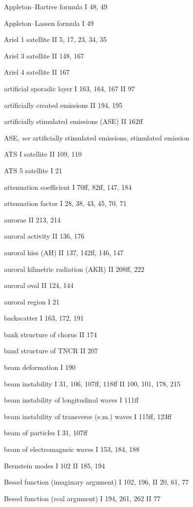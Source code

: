 \begin{thesubjectindex}
\item Appleton--Hartree formula I 48, 49
\item Appleton--Lassen formula I 49
\item Ariel 1 satellite II 5, 17, 23, 34, 35
\item Ariel 3 satellite II 148, 167
\item Ariel 4 satellite II 167
\item artificial sporadic layer I 163, 164, 167 II 97
\item artificially created emissions II 194, 195
\item artificially stimulated emissions (ASE) II 162ff
\item ASE, {\it see\/} artificially stimulated emissions, stimulated emission
\item ATS I satellite II 109, 110
\item ATS 5 satellite I 21
\item attenuation coefficient I 70ff, 82ff, 147, 184
\item attenuation factor I 28, 38, 43, 45, 70, 71
\item aurorae II 213, 214
\item auroral activity II 136, 176
\item auroral hiss (AH) II 137, 142ff, 146, 147
\item auroral kilmetric radiation (AKR) II 208ff, 222
\item auroral oval II 124, 144
\item auroral region I 21
\indexspace
\item backscatter I 163, 172, 191
\item bank structure of chorus II 174
\item band structure of TNCR II 207
\item beam deformation I 190
\item beam instability I 31, 106, 107ff, 118ff II 100, 101, 178, 215
\item beam instability of longitudinal waves I 111ff
\item beam instability of transverse (e.m.) waves I 115ff, 123ff
\item beam of particles I 31, 107ff
\item beam of electromagneic waves I 153, 184, 188
\item Bernstein modes I 102 II 185, 194
\item Bessel function (imaginary argument) I 102, 196, II 20, 61, 77
\item Bessel function (real argument) I 194, 261, 262 II 77

\end{thesubjectindex}
